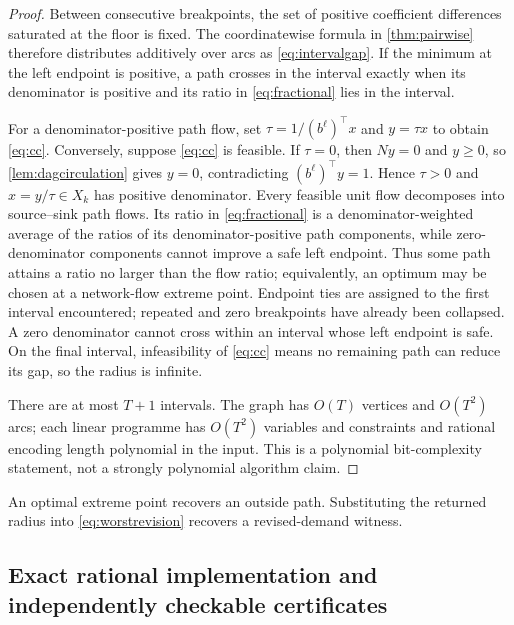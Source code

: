\documentclass[11pt]{article}
\theoremstyle{definition}
\begin{document}
\begin{proof}
Between consecutive breakpoints, the set of positive coefficient differences saturated at the floor is fixed. The coordinatewise formula in \cref{thm:pairwise} therefore distributes additively over arcs as \eqref{eq:intervalgap}. If the minimum at the left endpoint is positive, a path crosses in the interval exactly when its denominator is positive and its ratio in \eqref{eq:fractional} lies in the interval.

For a denominator-positive path flow, set $\tau=1/(b^\ell)^\top x$ and $y=\tau x$ to obtain \eqref{eq:cc}. Conversely, suppose \eqref{eq:cc} is feasible. If $\tau=0$, then $Ny=0$ and $y\ge0$, so \cref{lem:dagcirculation} gives $y=0$, contradicting $(b^\ell)^\top y=1$. Hence $\tau>0$ and $x=y/\tau\in X_k$ has positive denominator. Every feasible unit flow decomposes into source--sink path flows. Its ratio in \eqref{eq:fractional} is a denominator-weighted average of the ratios of its denominator-positive path components, while zero-denominator components cannot improve a safe left endpoint. Thus some path attains a ratio no larger than the flow ratio; equivalently, an optimum may be chosen at a network-flow extreme point. Endpoint ties are assigned to the first interval encountered; repeated and zero breakpoints have already been collapsed. A zero denominator cannot cross within an interval whose left endpoint is safe. On the final interval, infeasibility of \eqref{eq:cc} means no remaining path can reduce its gap, so the radius is infinite.

There are at most $T+1$ intervals. The graph has $O(T)$ vertices and $O(T^2)$ arcs; each linear programme has $O(T^2)$ variables and constraints and rational encoding length polynomial in the input. This is a polynomial bit-complexity statement, not a strongly polynomial algorithm claim.
\end{proof}

An optimal extreme point recovers an outside path. Substituting the returned radius into \eqref{eq:worstrevision} recovers a revised-demand witness.

\subsection*{Exact rational implementation and independently checkable certificates}
\end{document}
